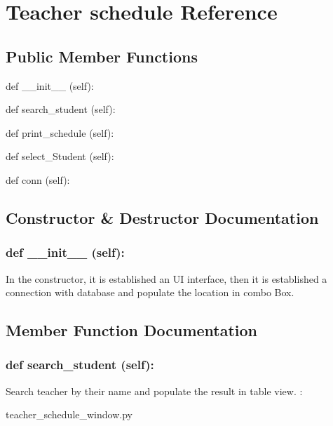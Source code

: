 \hypertarget{Teacher_schedule}{\section{Teacher schedule Reference}
\label{Teacher_schedule}
}
\subsection*{Public Member Functions}
\begin{DoxyCompactItemize}
\item 
def {\_\_init\_\_} (self):
\item 
def {search\_student} (self):
\item 
def {print\_schedule} (self):
\item 
def {select\_Student} (self):
\item 
def {conn} (self):
\end{DoxyCompactItemize}

\subsection{Constructor \& Destructor Documentation}
\hypertarget{class_poly_aa3def076b74bed67904976ad4f9fe9b1}{
\subsubsection[{def __init__ (self):}]{\setlength{\rightskip}{0pt plus 5cm}def {\_\_init\_\_} (self): 
}}
In the constructor, it is established an UI interface, then it is  established a connection with database and populate the location in combo Box.
 

\subsection{Member Function Documentation}
\hypertarget{class_poly_a14a7ad77ce612b0c54f531d307ee4b39}{
\subsubsection[{def search_student (self):}]{\setlength{\rightskip}{0pt plus 5cm}def {search\_student} (self):}}\label{class_poly_a14a7ad77ce612b0c54f531d307ee4b39}
Search teacher by their name and populate the result in table view.
:\begin{DoxyCompactItemize}
\item 
teacher\_schedule\_window.\-py\end{DoxyCompactItemize}

